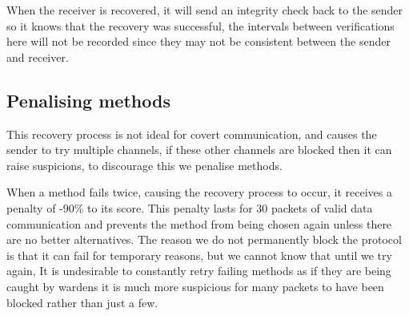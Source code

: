 When the receiver is recovered, it will send an integrity check back to the sender so it knows that the recovery was successful, the intervals between verifications here will not be recorded since they may not be consistent between the sender and receiver.

\subsection{Penalising methods}
\label{sec:penalising}

This recovery process is not ideal for covert communication, and causes the sender to try multiple channels, if these other channels are blocked then it can raise suspicions, to discourage this we penalise methods.

When a method fails twice, causing the recovery process to occur, it receives a penalty of -90\% to its score. This penalty lasts for 30 packets of valid data communication and prevents the method from being chosen again unless there are no better alternatives. The reason we do not permanently block the protocol is that it can fail for temporary reasons, but we cannot know that until we try again, It is undesirable to constantly retry failing methods as if they are being caught by wardens it is much more suspicious for many packets to have been blocked rather than just a few.
